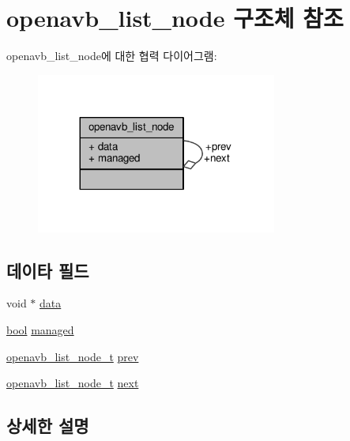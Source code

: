 \hypertarget{structopenavb__list__node}{}\section{openavb\+\_\+list\+\_\+node 구조체 참조}
\label{structopenavb__list__node}


openavb\+\_\+list\+\_\+node에 대한 협력 다이어그램\+:
\nopagebreak
\begin{figure}[H]
\begin{center}
\leavevmode
\includegraphics[width=224pt]{structopenavb__list__node__coll__graph}
\end{center}
\end{figure}
\subsection*{데이타 필드}
\begin{DoxyCompactItemize}
\item 
void $\ast$ \hyperlink{structopenavb__list__node_a735984d41155bc1032e09bece8f8d66d}{data}
\item 
\hyperlink{avb__gptp_8h_af6a258d8f3ee5206d682d799316314b1}{bool} \hyperlink{structopenavb__list__node_a8ff69266b2f44d218fdfe0c9d6950409}{managed}
\item 
\hyperlink{openavb__list_8h_a64023766d95092523c9da1927b31c105}{openavb\+\_\+list\+\_\+node\+\_\+t} \hyperlink{structopenavb__list__node_ae409f1ad808ca54426757b7f342cc110}{prev}
\item 
\hyperlink{openavb__list_8h_a64023766d95092523c9da1927b31c105}{openavb\+\_\+list\+\_\+node\+\_\+t} \hyperlink{structopenavb__list__node_a43567a94506b725de2077e8ea54e9cd7}{next}
\end{DoxyCompactItemize}


\subsection{상세한 설명}


